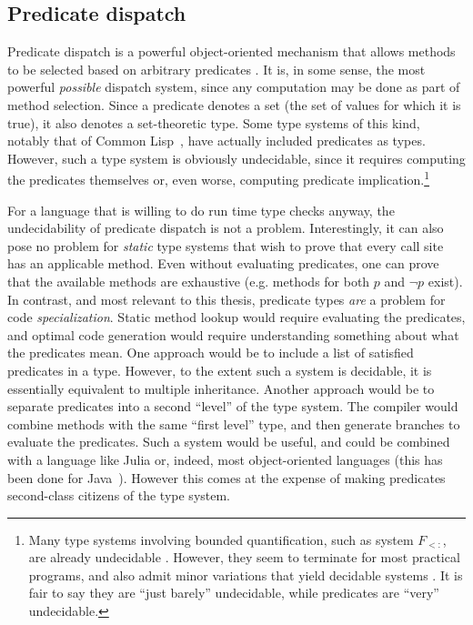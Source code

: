 

\subsection{Predicate dispatch}


Predicate dispatch is a powerful object-oriented mechanism that allows
methods to be selected based on arbitrary predicates \cite{ErnstKC98}.
It is, in some sense, the most powerful \emph{possible} dispatch system,
since any computation may be done as part of method selection.
Since a predicate denotes a set (the set of values for which it is true),
it also denotes a set-theoretic type.
Some type systems of this kind, notably that of Common
Lisp~\cite{steele1990common:types}, have actually included predicates as types.
However, such a type system is obviously undecidable, since it
requires computing the predicates themselves or, even worse, computing
predicate implication.\footnote{
Many type systems involving bounded quantification, such as system $F_{<:}$,
are already undecidable \cite{Pierce1994131}.
However, they seem to terminate for most practical programs, and also admit
minor variations that yield decidable systems \cite{Castagna:1994:DBQ:174675.177844}.
It is fair to say they are ``just barely'' undecidable, while predicates
are ``very'' undecidable.
}

For a language that is willing to do run time type checks anyway, the
undecidability of predicate dispatch is not a problem.
Interestingly, it can also pose no problem for \emph{static} type systems
that wish to prove that every call site has an applicable method.
Even without evaluating predicates, one can prove that the available methods
are exhaustive (e.g. methods for both $p$ and $\neg p$ exist).
In contrast, and most relevant to this thesis, predicate types \emph{are} a
problem for code \emph{specialization}.
Static method lookup would require evaluating the predicates, and optimal code
generation would require understanding something about what the predicates mean.
One approach would be to include a list of satisfied predicates in a type.
However, to the extent such a system is decidable, it is essentially equivalent
to multiple inheritance.
Another approach would be to separate predicates into a second ``level'' of the
type system.
The compiler would combine methods with the same ``first level'' type, and then
generate branches to evaluate the predicates.
Such a system would be useful, and could be
combined with a language like Julia or, indeed, most object-oriented
languages (this has been done for Java~\cite{Millstein:2009:EMP:1462166.1462168}).
However this comes at the expense of making predicates second-class
citizens of the type system.

